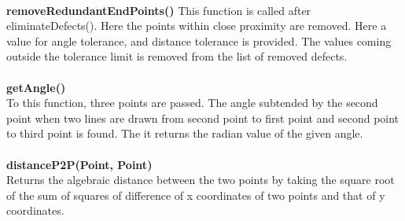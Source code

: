 \documentclass[a4paper,11pt]{article}
\begin{document}
    					 	\\
    					 \textbf{removeRedundantEndPoints()}
    					 	This function is called after eliminateDefects(). Here the points within close proximity are removed. Here a value for angle tolerance, and distance tolerance is provided. The values coming outside the tolerance limit is removed from the list of removed defects.\\
    					 	\\
    					 \textbf{getAngle()\\}
    					 	To this function, three points are passed. The angle subtended by the second point when two lines are drawn from second point to first point and second point to third point is found. The it returns the radian value of the given angle. \\
    					 	\\
    					 \textbf{distanceP2P(Point, Point)\\}
    					 	Returns the algebraic distance between the two points by taking the square root of the sum of squares of difference of x coordinates of two points and that of y coordinates.\\
    					 	\\
\end{document}
